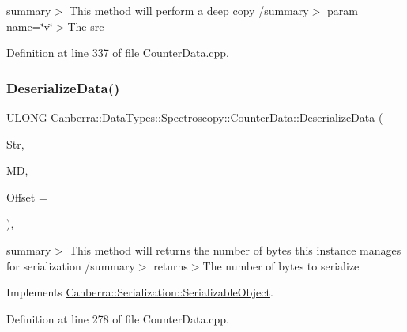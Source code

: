 summary$>$ This method will perform a deep copy /summary$>$ param name=\char`\"{}v\char`\"{}$>$The src

Definition at line 337 of file Counter\+Data.\+cpp.

\mbox{\label{class_canberra_1_1_data_types_1_1_spectroscopy_1_1_counter_data_aaeb262fc04a1ea323bc27990d74723e5_aaeb262fc04a1ea323bc27990d74723e5}} 
\subsubsection{\texorpdfstring{Deserialize\+Data()}{DeserializeData()}}
{\footnotesize\ttfamily U\+L\+O\+NG Canberra\+::\+Data\+Types\+::\+Spectroscopy\+::\+Counter\+Data\+::\+Deserialize\+Data (\begin{DoxyParamCaption}\item[{\hyperlink{class_canberra_1_1_utility_1_1_core_1_1_byte_stream}{Canberra\+::\+Utility\+::\+Core\+::\+Byte\+Stream} \&}]{Str,  }\item[{const \hyperlink{class_canberra_1_1_serialization_1_1_meta_data}{Canberra\+::\+Serialization\+::\+Meta\+Data} \&}]{MD,  }\item[{const L\+O\+NG}]{Offset = {} }\end{DoxyParamCaption})\hspace{0.3cm}{\ttfamily [protected]}, {\ttfamily [virtual]}}

summary$>$ This method will returns the number of bytes this instance manages for serialization /summary$>$ returns$>$The number of bytes to serialize

Implements \hyperlink{class_canberra_1_1_serialization_1_1_serializable_object}{Canberra\+::\+Serialization\+::\+Serializable\+Object}.



Definition at line 278 of file Counter\+Data.\+cpp.

\mbox{\label{class_canberra_1_1_data_types_1_1_spectroscopy_1_1_counter_data_a5a60e038c044f258a42903b16f25feba_a5a60e038c044f258a42903b16f25feba}} 
